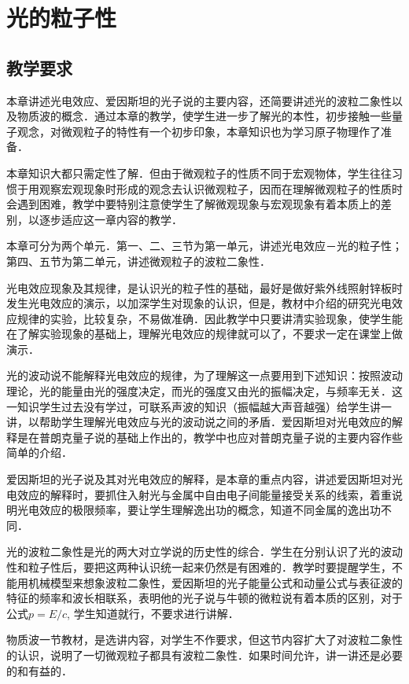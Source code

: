 \chapter{光的粒子性}\minitoc[n]
\section{教学要求}

本章讲述光电效应、爱因斯坦的光子说的主要内容，还简要讲述光的波粒二象性以及物质波的概念．通过本章的教学，使学生进一步了解光的本性，初步接触一些量子观念，对微观粒子的特性有一个初步印象，本章知识也为学习原子物理作了准备．

本章知识大都只需定性了解．但由于微观粒子的性质不同于宏观物体，学生往往习惯于用观察宏观现象时形成的观念去认识微观粒子，因而在理解微观粒子的性质时会遇到困难，教学中要特别注意使学生了解微观现象与宏观现象有着本质上的差别，以逐步适应这一章内容的教学．

本章可分为两个单元．第一、二、三节为第一单元，讲述光电效应－光的粒子性；第四、五节为第二单元，讲述微观粒子的波粒二象性．

光电效应现象及其规律，是认识光的粒子性的基础，最好是做好紫外线照射锌板时发生光电效应的演示，以加深学生对现象的认识，但是，教材中介绍的研究光电效应规律的实验，比较复杂，不易做准确．因此教学中只要讲清实验现象，使学生能在了解实验现象的基础上，理解光电效应的规律就可以了，不要求一定在课堂上做演示．

光的波动说不能解释光电效应的规律，为了理解这一点要用到下述知识：按照波动理论，光的能量由光的强度决定，而光的强度又由光的振幅决定，与频率无关．这一知识学生过去没有学过，可联系声波的知识（振幅越大声音越强）给学生讲一讲，以帮助学生理解光电效应与光的波动说之间的矛盾．爱因斯坦对光电效应的解释是在普朗克量子说的基础上作出的，教学中也应对普朗克量子说的主要内容作些简单的介绍．

爱因斯坦的光子说及其对光电效应的解释，是本章的重点内容，讲述爱因斯坦对光电效应的解释时，要抓住入射光与金属中自由电子间能量接受关系的线索，着重说明光电效应的极限频率，要让学生理解逸出功的概念，知道不同金属的逸出功不同．

光的波粒二象性是光的两大对立学说的历史性的综合．学生在分别认识了光的波动性和粒子性后，要把这两种认识统一起来仍然是有困难的．教学时要提醒学生，不能用机械模型来想象波粒二象性，爱因斯坦的光子能量公式和动量公式与表征波的特征的频率和波长相联系，表明他的光子说与牛顿的微粒说有着本质的区别，对于公式$p=E/c$, 学生知道就行，不要求进行讲解．

物质波一节教材，是选讲内容，对学生不作要求，但这节内容扩大了对波粒二象性的认识，说明了一切微观粒子都具有波粒二象性．如果时间允许，讲一讲还是必要的和有益的．

